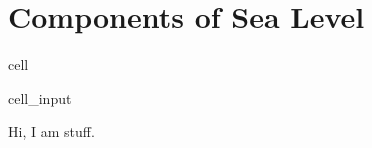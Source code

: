\documentclass[letterpaper,10pt,english]{jupyterBook}
\begin{document}
\part{Components of Sea Level}
\label{\detokenize{notebooks/regional_and_local/SL_Components_intra-annual:components-of-sea-level}}\label{\detokenize{notebooks/regional_and_local/SL_Components_intra-annual::doc}}
\begin{sphinxuseclass}{cell}\begin{sphinxVerbatimInput}

\begin{sphinxuseclass}{cell_input}
\begin{sphinxVerbatim}[commandchars=\\\{\}]
\end{sphinxVerbatim}

\end{sphinxuseclass}\end{sphinxVerbatimInput}

\end{sphinxuseclass}
\sphinxAtStartPar
Hi, I am stuff.
\end{document}
